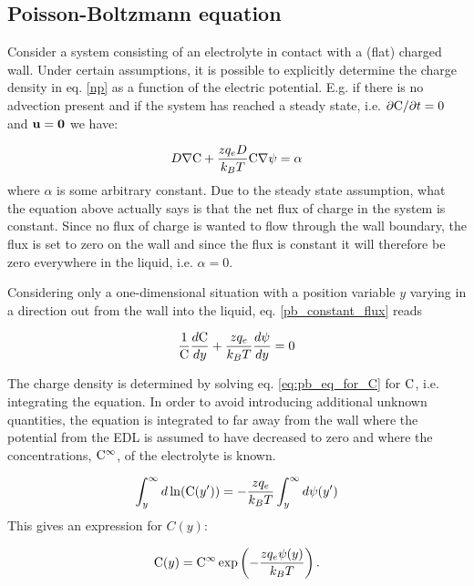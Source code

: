 \subsection{Poisson-Boltzmann equation}\label{sec:et:pb}
Consider a system consisting of an electrolyte in contact with a
(flat) charged wall.  Under certain assumptions, it is possible to
explicitly determine the charge density in eq. \eqref{np} as a
function of the electric potential. E.g. if there is no advection
present and if the system has reached a steady state, i.e. $\partial
\mathrm{C} /\partial t = 0$ and $\mathbf{u} = \mathbf{0}$ we have:

\begin{equation}\label{pb_constant_flux}
D\nabla \mathrm{C} + \frac{zq_eD}{k_BT}\mathrm{C}\nabla\mathrm{\psi} = \alpha
\end{equation} 
where $\alpha$ is some arbitrary constant. Due to the steady state
assumption, what the equation above actually says is that the net flux
of charge in the system is constant. Since no flux of charge is wanted
to flow through the wall boundary, the flux is set to zero on the wall
and since the flux is constant it will therefore be zero everywhere in
the liquid, i.e. $\alpha = 0$.

Considering only a one-dimensional situation with a position variable
$y$ varying in a direction out from the wall into the liquid,
eq. \eqref{pb_constant_flux} reads

\begin{equation}\label{eq:pb_eq_for_C}
\frac{1}{\mathrm{C}} \dfrac{d \mathrm{C}}{d y} + \frac{zq_e}{k_BT} \dfrac{d \mathrm{\psi}}{d y} = 0
\end{equation}

The charge density is determined by solving eq. \eqref{eq:pb_eq_for_C}
for $\mathrm{C}$, i.e. integrating the equation. In order to avoid introducing
additional unknown quantities, the equation is integrated to far away
from the wall where the potential from the EDL is assumed to have
decreased to zero and where the concentrations, $\mathrm{C}^{\infty}$, of the
electrolyte is known.

\begin{equation}
\int_y^{\infty} d\ln( \mathrm{C}(y')) = -\frac{z q_e}{k_BT}\int_y^{\infty}d\mathrm{\psi}(y')
\end{equation}
This gives an expression for $C(y)$:

\begin{equation}\label{eq:C}
\mathrm{C}(y) = \mathrm{C}^{\infty} \exp\left(-\frac{z q_e \mathrm{\psi}(y)}{k_BT}\right).
\end{equation}

